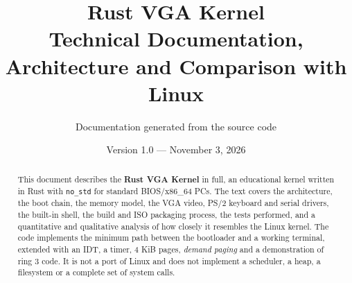 \documentclass[11pt,a4paper,oneside]{report}
\title{\vspace{-2cm}\textbf{Rust VGA Kernel}\\[0.4em]
       \Large Technical Documentation, Architecture and Comparison with Linux}
\author{Documentation generated from the source code}
\date{Version 1.0 --- November 3, 2026}
\newcommand{\code}[1]{\texttt{#1}}
\begin{document}

\maketitle

\begin{abstract}
This document describes the \textbf{Rust VGA Kernel} in full, an educational
kernel written in Rust with \code{no\_std} for standard BIOS/x86\_64 PCs.
The text covers the architecture, the boot chain, the memory model, the VGA
video, PS/2 keyboard and serial drivers, the built-in shell, the build and ISO
packaging process, the tests performed, and a quantitative and qualitative
analysis of how closely it resembles the Linux kernel.
The code implements the minimum path between the bootloader and a working
terminal, extended with an IDT, a timer, 4 KiB pages, \emph{demand paging}
and a demonstration of ring 3 code. It is not a port of Linux and does not
implement a scheduler, a heap, a filesystem or a complete set of system calls.
\end{abstract}

\tableofcontents
\listoffigures
\listoftables

\clearpage
















\end{document}
